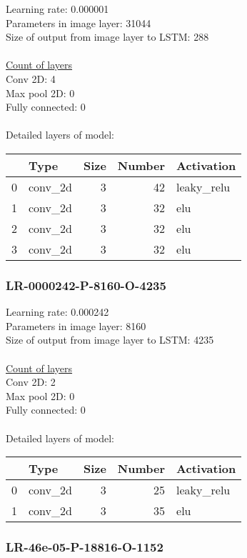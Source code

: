 Learning rate: 0.000001
\\Parameters in image layer: 31044
\\Size of output from image layer to LSTM: 288
\\\\\underline{Count of layers} 
\\Conv 2D:           4\\Max pool 2D:      0\\Fully connected:  0
\\\\Detailed layers of model: \\\begin{tabular}{rlrrl}
\hline
    & Type    &   Size &   Number & Activation   \\
\hline
  0 & conv\_2d &      3 &       42 & leaky\_relu   \\
  1 & conv\_2d &      3 &       32 & elu          \\
  2 & conv\_2d &      3 &       32 & elu          \\
  3 & conv\_2d &      3 &       32 & elu          \\
\hline
\end{tabular}\subsubsection*{LR-0000242-P-8160-O-4235}
Learning rate: 0.000242
\\Parameters in image layer: 8160
\\Size of output from image layer to LSTM: 4235
\\\\\underline{Count of layers} 
\\Conv 2D:           2\\Max pool 2D:      0\\Fully connected:  0
\\\\Detailed layers of model: \\\begin{tabular}{rlrrl}
\hline
    & Type    &   Size &   Number & Activation   \\
\hline
  0 & conv\_2d &      3 &       25 & leaky\_relu   \\
  1 & conv\_2d &      3 &       35 & elu          \\
\hline
\end{tabular}\subsubsection*{LR-46e-05-P-18816-O-1152}
